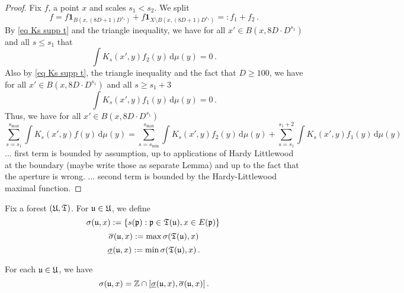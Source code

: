 
\begin{proof}
    Fix $f$, a point $x$ and scales $s_1 < s_2$. We split
    $$
        f = f\mathbf{1}_{B(x, (8D + 1)D^{s_1})} + f\mathbf{1}_{X \setminus B(x, (8D + 1)D^{s_1})} =: f_1 + f_2\,.
    $$
    By \eqref{eq Ks supp t} and the triangle inequality, we have for all $x' \in B(x, 8D \cdot D^{s_1})$ and all $s \le s_1$ that
    \begin{equation}
        \label{eq outside}
        \int K_s(x', y) f_2(y) \, \mathrm{d}\mu(y) = 0\,.
    \end{equation}
    Also by \eqref{eq Ks supp t}, the triangle inequality and the fact that $D \ge 100$, we have for all $x' \in B(x, 8D \cdot D^{s_1})$ and all $s \ge s_1 + 3$
    \begin{equation}
        \label{eq outside}
        \int K_s(x', y) f_1(y) \, \mathrm{d}\mu(y) = 0\,.
    \end{equation}
    Thus, we have for all $x' \in B(x, 8D \cdot D^{s_1})$
    \begin{equation}
        \sum_{s = s_1}^{s_{\max}} \int K_s(x',y) f(y) \, \mathrm{d}\mu(y) = \sum_{s = s_{\min}}^{s_{\max}} \int K_s(x',y) f_2(y) \, \mathrm{d}\mu(y) + \sum_{s = s_1}^{s_1 + 2} \int K_s(x', y) f_1(y) \, \mathrm{d}\mu(y)
    \end{equation}
    ... first term is bounded by assumption, up to applications of Hardy Littlewood at the boundary (maybe write those as separate Lemma) and up to the fact that the aperture is wrong.
    ... second term is bounded by the Hardy-Littlewood maximal function.
\end{proof}

Fix a forest $(\mathfrak U, \mathfrak T)$.
For $\mathfrak u \in \mathfrak U$, we define
$$
    \sigma (\mathfrak u, x):=\{s(\mathfrak p):\mathfrak p\in \mathfrak T(\mathfrak u), x\in E(\mathfrak p)\}\,
$$
$$
    \overline{\sigma} (\mathfrak u, x) := \max \sigma(\mathfrak T(\mathfrak u), x)
$$
$$
    \underline{\sigma} (\mathfrak u, x) := \min\sigma(\mathfrak T(\mathfrak u), x)\,.
$$
\begin{lemma}
\label{lem sigma convex}
    For each $\mathfrak u \in \mathfrak U$, we have
    $$
        \sigma(\mathfrak u, x) = \mathbb{Z} \cap [\underline{\sigma} (\mathfrak u, x), \overline{\sigma} (\mathfrak u, x)]\,.
    $$
\end{lemma}

